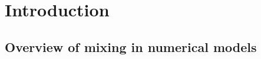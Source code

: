 \documentclass[draft]{agujournal2019}
\begin{document}
%
%
%
%

\section{Introduction}

\subsection{Overview of mixing in numerical models}
\end{document}
